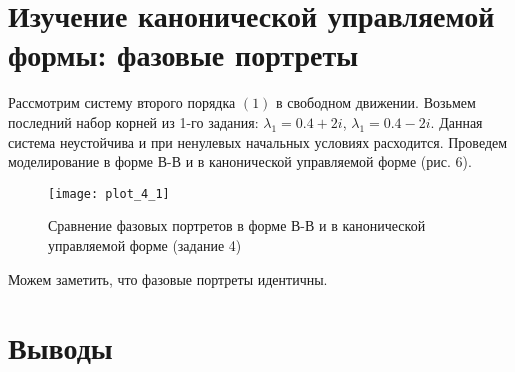 \pagebreak

\section{Изучение канонической управляемой формы: фазовые портреты}
Рассмотрим систему второго порядка $(1)$ в свободном движении. Возьмем последний набор корней из 1-го задания:
$\lambda_1 = 0.4 + 2 i$, $\lambda_1 = 0.4 - 2 i$. Данная система неустойчива и при ненулевых начальных условиях
расходится. Проведем моделирование в форме В-В и в канонической управляемой форме (рис. 6).
\begin{figure}[h]
    \centering
    \texttt{[image: plot\_4\_1]}
    \caption{\label{fig:The-caption-1}Сравнение фазовых портретов в форме В-В и в канонической
    управляемой форме (задание 4)}
\end{figure}

Можем заметить, что фазовые портреты идентичны. 
\pagebreak

\section{Выводы}

\pagebreak
